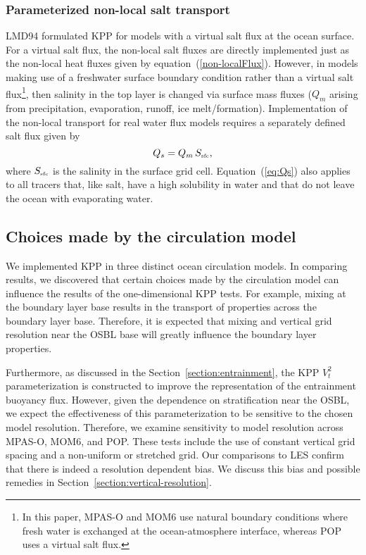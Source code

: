 \documentclass[preprint,12pt,authoryear]{agujournal}
\begin{document}
\subsubsection{Parameterized non-local salt transport}

LMD94 formulated KPP for models with a virtual salt flux at the ocean surface. For a virtual salt flux, the non-local salt fluxes are directly implemented just as the non-local heat fluxes given by equation~(\ref{non-localFlux}). However, in models making use of a freshwater surface boundary condition rather than a virtual salt flux\footnote{In this paper, MPAS-O and MOM6 use natural boundary conditions where fresh water is exchanged at the ocean-atmosphere interface, whereas POP uses a virtual salt flux.}, then salinity in the top layer is changed via surface mass fluxes ($Q_m$ arising from precipitation, evaporation, runoff, ice melt/formation).  Implementation of the non-local transport for real water flux models requires a separately defined salt flux given by  
\begin{equation}
\label{eq:Qs}
 Q_s = Q_m \, S_{\mbox{\tiny sfc}},
 \end{equation}
 where $S_{\mbox{\tiny sfc}}$ is the salinity in the surface grid cell. Equation~(\ref{eq:Qs}) also applies to all tracers that, like salt, have a high solubility in water and that do not leave the ocean with evaporating water.  

\subsection{Choices made by the circulation model}
\label{section:modelchoices}

We implemented KPP in three distinct ocean circulation models. In comparing results, we discovered that certain choices made by the circulation model can influence the results of the one-dimensional KPP tests. For example, mixing at the boundary layer base results in the transport of properties across the boundary layer base.  Therefore, it is expected that mixing and vertical grid resolution near the OSBL base will greatly influence the boundary layer properties. 

Furthermore, as discussed in the Section~\ref{section:entrainment}, the KPP $V_t^2$ parameterization is constructed to improve the representation of the entrainment buoyancy flux.  However, given the dependence on stratification near the OSBL, we expect the effectiveness of this parameterization to be sensitive to the chosen model resolution.  Therefore, we examine sensitivity to model resolution across MPAS-O, MOM6, and POP.  These tests include the use of constant vertical grid spacing and a non-uniform or stretched grid.  Our comparisons to LES confirm that there is indeed a resolution dependent bias.  We discuss this bias and possible remedies in Section~\ref{section:vertical-resolution}.
\end{document}
